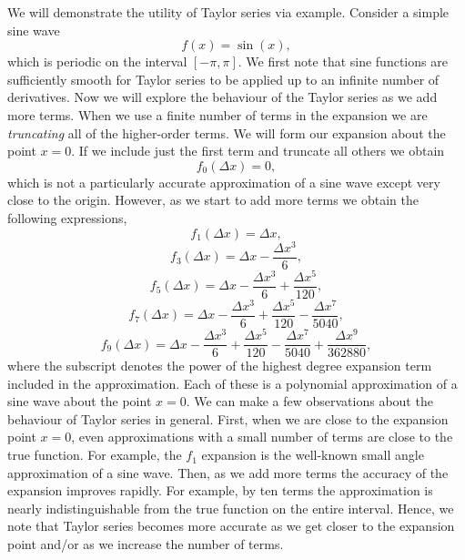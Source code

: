 We will demonstrate the utility of Taylor series via example. Consider a simple sine wave 
\begin{equation}
	f(x) = \sin(x),
\end{equation}
which is periodic on the interval $[- \pi, \pi]$. We first note that sine functions are sufficiently smooth for Taylor series to be applied up to an infinite number of derivatives. Now we will explore the behaviour of the Taylor series as we add more terms. When we use a finite number of terms in the expansion we are {\it truncating} all of the higher-order terms. We will form our expansion about the point $x = 0$. If we include just the first term and truncate all others we obtain
\begin{equation}
	f_0(\Delta x) = 0,
\end{equation}
which is not a particularly accurate approximation of a sine wave except very close to the origin. However, as we start to add more terms we obtain the following expressions,
\begin{equation}
	f_1(\Delta x) = \Delta x,
\end{equation}
\begin{equation}
	f_3(\Delta x) = \Delta x - \frac{\Delta x^3}{6},
\end{equation}
\begin{equation}
	f_5(\Delta x) = \Delta x - \frac{\Delta x^3}{6} + \frac{\Delta x^5}{120},
\end{equation}
\begin{equation}
	f_7(\Delta x) = \Delta x - \frac{\Delta x^3}{6} + \frac{\Delta x^5}{120} - \frac{\Delta x^7}{5040},
\end{equation}
\begin{equation}
	f_{9}(\Delta x) = \Delta x - \frac{\Delta x^3}{6} + \frac{\Delta x^5}{120} - \frac{\Delta x^7}{5040} + \frac{\Delta x^9}{362880},
\end{equation}
where the subscript denotes the power of the highest degree expansion term included in the approximation. Each of these is a polynomial approximation of a sine wave about the point $x=0$. We can make a few observations about the behaviour of Taylor series in general. First, when we are close to the expansion point $x=0$, even approximations with a small number of terms are close to the true function. For example, the $f_1$ expansion is the well-known small angle approximation of a sine wave. Then, as we add more terms the accuracy of the expansion improves rapidly. For example, by ten terms the approximation is nearly indistinguishable from the true function on the entire interval. Hence, we note that Taylor series becomes more accurate as we get closer to the expansion point and/or as we increase the number of terms.
